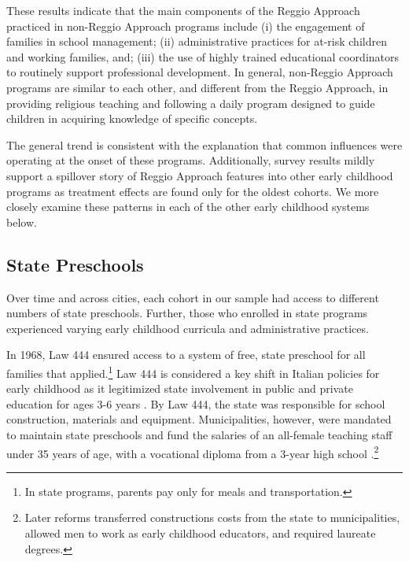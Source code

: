 These results indicate that the main components of the Reggio Approach practiced in non-Reggio Approach programs include (i) the engagement of families in school management; (ii) administrative practices for at-risk children and working families, and; (iii) the use of highly trained educational coordinators to routinely support professional development. In general, non-Reggio Approach programs are similar to each other, and different from the Reggio Approach, in providing religious teaching and following a daily program designed to guide children in acquiring knowledge of specific concepts. 

The general trend is consistent with the explanation that common influences were operating at the onset of these programs. Additionally, survey results mildly support a spillover story of Reggio Approach features into other early childhood programs as treatment effects are found only for the oldest cohorts. We more closely examine these patterns in each of the other early childhood systems below. 

\subsection{State Preschools}

Over time and across cities, each cohort in our sample had access to different numbers of state preschools. Further, those who enrolled in state programs experienced varying early childhood curricula and administrative practices.

In 1968, Law 444 ensured access to a system of free, state preschool for all families that applied.\footnote{In state programs, parents pay only for meals and transportation.} Law 444 is considered a key shift in Italian policies for early childhood as it legitimized state involvement in public and private education for ages 3-6 years \citep{Hohnerlein_2009_Paradox-Public-Preschools}. By Law 444, the state was responsible for school construction, materials and equipment. Municipalities, however, were mandated to maintain state preschools and fund the salaries of an all-female teaching staff under 35 years of age, with a vocational diploma from a 3-year high school \citep{OECD_2001_Italy-Country-Note}.\footnote{Later reforms transferred constructions costs from the state to municipalities, allowed men to work as early childhood educators, and required laureate degrees.} 

